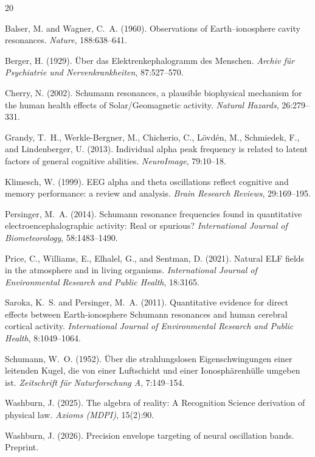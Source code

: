 \documentclass[11pt,a4paper]{article}
\begin{document}
\begin{thebibliography}{20}

Balser, M. and Wagner, C.~A. (1960).
\newblock Observations of Earth--ionosphere cavity resonances.
\newblock \emph{Nature}, 188:638--641.

Berger, H. (1929).
\newblock \"{U}ber das Elektrenkephalogramm des Menschen.
\newblock \emph{Archiv f\"{u}r Psychiatrie und Nervenkrankheiten},
  87:527--570.

Cherry, N. (2002).
\newblock Schumann resonances, a plausible biophysical mechanism for the
  human health effects of Solar/Geomagnetic activity.
\newblock \emph{Natural Hazards}, 26:279--331.

Grandy, T.~H., Werkle-Bergner, M., Chicherio, C., L\"{o}vd\'{e}n, M.,
  Schmiedek, F., and Lindenberger, U. (2013).
\newblock Individual alpha peak frequency is related to latent factors of
  general cognitive abilities.
\newblock \emph{NeuroImage}, 79:10--18.

Klimesch, W. (1999).
\newblock EEG alpha and theta oscillations reflect cognitive and memory
  performance: a review and analysis.
\newblock \emph{Brain Research Reviews}, 29:169--195.

Persinger, M.~A. (2014).
\newblock Schumann resonance frequencies found in quantitative
  electroencephalographic activity: Real or spurious?
\newblock \emph{International Journal of Biometeorology}, 58:1483--1490.

Price, C., Williams, E., Elhalel, G., and Sentman, D. (2021).
\newblock Natural ELF fields in the atmosphere and in living organisms.
\newblock \emph{International Journal of Environmental Research and
  Public Health}, 18:3165.

Saroka, K.~S. and Persinger, M.~A. (2011).
\newblock Quantitative evidence for direct effects between
  Earth-ionosphere Schumann resonances and human cerebral cortical
  activity.
\newblock \emph{International Journal of Environmental Research and
  Public Health}, 8:1049--1064.

Schumann, W.~O. (1952).
\newblock \"{U}ber die strahlungslosen Eigenschwingungen einer leitenden
  Kugel, die von einer Luftschicht und einer Ionosph\"{a}renh\"{u}lle
  umgeben ist.
\newblock \emph{Zeitschrift f\"{u}r Naturforschung A}, 7:149--154.

Washburn, J. (2025).
\newblock The algebra of reality: A Recognition Science derivation of
  physical law.
\newblock \emph{Axioms (MDPI)}, 15(2):90.

Washburn, J. (2026).
\newblock Precision envelope targeting of neural oscillation bands.
\newblock Preprint.

\end{thebibliography}
\end{document}
